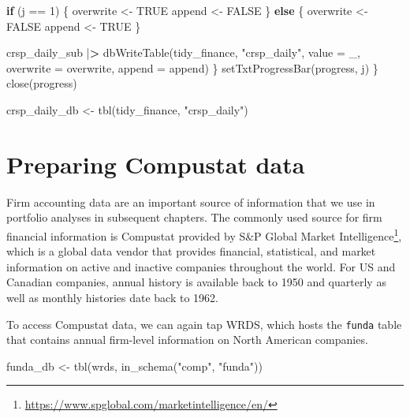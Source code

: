 \documentclass[
]{book}
\newenvironment{Shaded}{\begin{snugshade}}{\end{snugshade}}
\newcommand{\AttributeTok}[1]{\textcolor[rgb]{0.61,0.61,0.61}{#1}}
\newcommand{\ConstantTok}[1]{\textcolor[rgb]{0,0,0}{#1}}
\newcommand{\ControlFlowTok}[1]{\textcolor[rgb]{0.27,0.27,0.27}{\textbf{#1}}}
\newcommand{\DecValTok}[1]{\textcolor[rgb]{0.06,0.06,0.06}{#1}}
\newcommand{\ErrorTok}[1]{\textcolor[rgb]{0.14,0.14,0.14}{\textbf{#1}}}
\newcommand{\FunctionTok}[1]{\textcolor[rgb]{0,0,0}{#1}}
\newcommand{\NormalTok}[1]{#1}
\newcommand{\OtherTok}[1]{\textcolor[rgb]{0.37,0.37,0.37}{#1}}
\newcommand{\SpecialCharTok}[1]{\textcolor[rgb]{0,0,0}{#1}}
\newcommand{\StringTok}[1]{\textcolor[rgb]{0.5,0.5,0.5}{#1}}
\renewcommand{\href}[2]{#2\footnote{\url{#1}}}
\begin{document}
\begin{Shaded}
\begin{Highlighting}[]
    \ControlFlowTok{if}\NormalTok{ (j }\SpecialCharTok{==} \DecValTok{1}\NormalTok{) \{}
\NormalTok{      overwrite }\OtherTok{\textless{}{-}} \ConstantTok{TRUE}
\NormalTok{      append }\OtherTok{\textless{}{-}} \ConstantTok{FALSE}
\NormalTok{    \} }\ControlFlowTok{else}\NormalTok{ \{}
\NormalTok{      overwrite }\OtherTok{\textless{}{-}} \ConstantTok{FALSE}
\NormalTok{      append }\OtherTok{\textless{}{-}} \ConstantTok{TRUE}
\NormalTok{    \}}

\NormalTok{    crsp\_daily\_sub }\SpecialCharTok{|}\ErrorTok{\textgreater{}}
      \FunctionTok{dbWriteTable}\NormalTok{(tidy\_finance, }
                   \StringTok{"crsp\_daily"}\NormalTok{, }
                   \AttributeTok{value =}\NormalTok{ \_, }
                   \AttributeTok{overwrite =}\NormalTok{ overwrite, }
                   \AttributeTok{append =}\NormalTok{ append)}
\NormalTok{  \}}
  \FunctionTok{setTxtProgressBar}\NormalTok{(progress, j)}
\NormalTok{\}}
\FunctionTok{close}\NormalTok{(progress)}

\NormalTok{crsp\_daily\_db }\OtherTok{\textless{}{-}} \FunctionTok{tbl}\NormalTok{(tidy\_finance, }\StringTok{"crsp\_daily"}\NormalTok{)}
\end{Highlighting}
\end{Shaded}

\hypertarget{preparing-compustat-data}{%
\section{Preparing Compustat data}\label{preparing-compustat-data}}

Firm accounting data are an important source of information that we use in portfolio analyses in subsequent chapters. The commonly used source for firm financial information is Compustat provided by \href{https://www.spglobal.com/marketintelligence/en/}{S\&P Global Market Intelligence}, which is a global data vendor that provides financial, statistical, and market information on active and inactive companies throughout the world. For US and Canadian companies, annual history is available back to 1950 and quarterly as well as monthly histories date back to 1962.

To access Compustat data, we can again tap WRDS, which hosts the \texttt{funda} table that contains annual firm-level information on North American companies.

\begin{Shaded}
\begin{Highlighting}[]
\NormalTok{funda\_db }\OtherTok{\textless{}{-}} \FunctionTok{tbl}\NormalTok{(wrds, }\FunctionTok{in\_schema}\NormalTok{(}\StringTok{"comp"}\NormalTok{, }\StringTok{"funda"}\NormalTok{))}
\end{Highlighting}
\end{Shaded}
\end{document}
